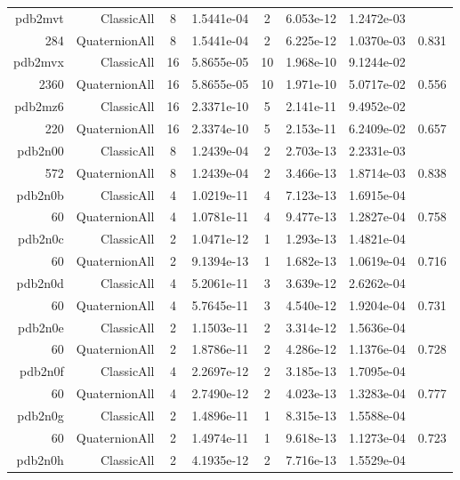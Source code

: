 \begin{xltabular}{\textwidth}{r|rcS[table-format=1.4e+2]cS[table-format=1.3e+2]S[table-format=1.4e+2]S[table-format=-1.3]}
pdb2mvt & ClassicAll & 8 & 1.5441e-04 & 2 & 6.053e-12 & 1.2472e-03 & \\
284 & QuaternionAll & 8 & 1.5441e-04 & 2 & 6.225e-12 & 1.0370e-03 & 0.831\\  \addlinespace
{\color{red} pdb2mvx } & ClassicAll & 16 & 5.8655e-05 & 10 & 1.968e-10 & 9.1244e-02 & \\
2360 & QuaternionAll & 16 & 5.8655e-05 & 10 & 1.971e-10 & 5.0717e-02 & 0.556\\  \addlinespace
{\color{red} pdb2mz6 } & ClassicAll & 16 & 2.3371e-10 & 5 & 2.141e-11 & 9.4952e-02 & \\
220 & QuaternionAll & 16 & 2.3374e-10 & 5 & 2.153e-11 & 6.2409e-02 & 0.657\\  \addlinespace
pdb2n00 & ClassicAll & 8 & 1.2439e-04 & 2 & 2.703e-13 & 2.2331e-03 & \\
572 & QuaternionAll & 8 & 1.2439e-04 & 2 & 3.466e-13 & 1.8714e-03 & 0.838\\  \addlinespace
pdb2n0b & ClassicAll & 4 & 1.0219e-11 & 4 & 7.123e-13 & 1.6915e-04 & \\
60 & QuaternionAll & 4 & 1.0781e-11 & 4 & 9.477e-13 & 1.2827e-04 & 0.758\\  \addlinespace
pdb2n0c & ClassicAll & 2 & 1.0471e-12 & 1 & 1.293e-13 & 1.4821e-04 & \\
60 & QuaternionAll & 2 & 9.1394e-13 & 1 & 1.682e-13 & 1.0619e-04 & 0.716\\  \addlinespace
pdb2n0d & ClassicAll & 4 & 5.2061e-11 & 3 & 3.639e-12 & 2.6262e-04 & \\
60 & QuaternionAll & 4 & 5.7645e-11 & 3 & 4.540e-12 & 1.9204e-04 & 0.731\\  \addlinespace
pdb2n0e & ClassicAll & 2 & 1.1503e-11 & 2 & 3.314e-12 & 1.5636e-04 & \\
60 & QuaternionAll & 2 & 1.8786e-11 & 2 & 4.286e-12 & 1.1376e-04 & 0.728\\  \addlinespace
pdb2n0f & ClassicAll & 4 & 2.2697e-12 & 2 & 3.185e-13 & 1.7095e-04 & \\
60 & QuaternionAll & 4 & 2.7490e-12 & 2 & 4.023e-13 & 1.3283e-04 & 0.777\\  \addlinespace
pdb2n0g & ClassicAll & 2 & 1.4896e-11 & 1 & 8.315e-13 & 1.5588e-04 & \\
60 & QuaternionAll & 2 & 1.4974e-11 & 1 & 9.618e-13 & 1.1273e-04 & 0.723\\  \addlinespace
pdb2n0h & ClassicAll & 2 & 4.1935e-12 & 2 & 7.716e-13 & 1.5529e-04 & \\

\end{xltabular}
